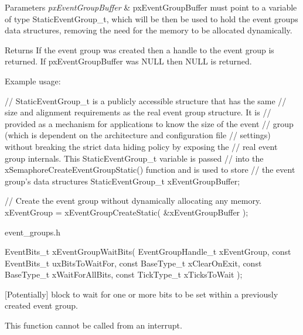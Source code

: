 \begin{DoxyParams}{Parameters}
{\em px\+Event\+Group\+Buffer} & px\+Event\+Group\+Buffer must point to a variable of type Static\+Event\+Group\+\_\+t, which will be then be used to hold the event group\textquotesingle{}s data structures, removing the need for the memory to be allocated dynamically.\\
\hline
\end{DoxyParams}
\begin{DoxyReturn}{Returns}
If the event group was created then a handle to the event group is returned. If px\+Event\+Group\+Buffer was N\+U\+LL then N\+U\+LL is returned.
\end{DoxyReturn}
Example usage\+: 
\begin{DoxyPre}
   // StaticEventGroup\_t is a publicly accessible structure that has the same
   // size and alignment requirements as the real event group structure.  It is
   // provided as a mechanism for applications to know the size of the event
   // group (which is dependent on the architecture and configuration file
   // settings) without breaking the strict data hiding policy by exposing the
   // real event group internals.  This StaticEventGroup\_t variable is passed
   // into the xSemaphoreCreateEventGroupStatic() function and is used to store
   // the event group's data structures
   StaticEventGroup\_t xEventGroupBuffer;\end{DoxyPre}



\begin{DoxyPre}   // Create the event group without dynamically allocating any memory.
   xEventGroup = xEventGroupCreateStatic( &xEventGroupBuffer );
  \end{DoxyPre}
 event\+\_\+groups.\+h 
\begin{DoxyPre}
   EventBits\_t xEventGroupWaitBits(     EventGroupHandle\_t xEventGroup,
                                    const EventBits\_t uxBitsToWaitFor,
                                    const BaseType\_t xClearOnExit,
                                    const BaseType\_t xWaitForAllBits,
                                    const TickType\_t xTicksToWait );
\end{DoxyPre}


\mbox{[}Potentially\mbox{]} block to wait for one or more bits to be set within a previously created event group.

This function cannot be called from an interrupt.


